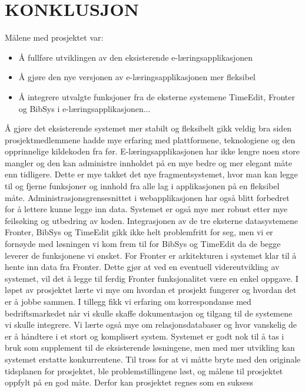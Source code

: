 \documentclass[../main.tex]{subfiles}
\begin{document}
\section{KONKLUSJON}

Målene med prosjektet var:
\begin{itemize}
\item Å fullføre utviklingen av den eksisterende e-læringsapplikasjonen
\item Å gjøre den nye versjonen av e-læringsapplikasjonen mer fleksibel
\item Å integrere utvalgte funksjoner fra de eksterne systemene TimeEdit, Fronter og BibSys i e-læringsapplikasjonen...
\end{itemize}
Å gjøre det eksisterende systemet mer stabilt og fleksibelt gikk veldig bra siden prosjektmedlemmene hadde mye erfaring med plattformene, teknologiene og den opprinnelige kildekoden fra før. E-læringsapplikasjonen har ikke lengre noen store mangler og den kan administre innholdet på en mye bedre og mer elegant måte enn tidligere. Dette er mye takket det nye fragmentsystemet, hvor man kan legge til og fjerne funksjoner og innhold fra alle lag i applikasjonen på en fleksibel måte. Administrasjonsgrensesnittet i webapplikasjonen har også blitt forbedret for å lettere kunne legge inn data. Systemet er også mye mer robust etter mye feilsøking og utbedring av koden.\newline
\newline
Integrasjonen av de tre eksterne datasystemene Fronter, BibSys og TimeEdit gikk ikke helt problemfritt for seg, men vi er fornøyde med løsningen vi kom frem til for BibSys og TimeEdit da de begge leverer de funksjonene vi ønsket. For Fronter er arkitekturen i systemet klar til å hente inn data fra Fronter. Dette gjør at ved en eventuell videreutvikling av systemet, vil det å legge til ferdig Fronter funksjonalitet være en enkel oppgave.\newline
\newline
I løpet av prosjektet lærte vi mye om hvordan et prosjekt fungerer og hvordan det er å jobbe sammen. I tillegg fikk vi erfaring om korrespondanse med bedriftsmarkedet når vi skulle skaffe dokumentasjon og tilgang til de systemene vi skulle integrere. Vi lærte også mye om relasjonsdatabaser og hvor vanskelig de er å håndtere i et stort og komplisert system.\newline
\newline
Systemet er godt nok til å tas i bruk som supplement til de eksisterende løsningene, men med mer utvikling kan systemet erstatte konkurrentene.\newline
\newline
Til tross for at vi måtte bryte med den originale tidsplanen for prosjektet, ble problemstillingene løst, og målene til prosjektet oppfylt på en god måte. Derfor kan prosjektet regnes som en suksess

\newpage
\end{document}
